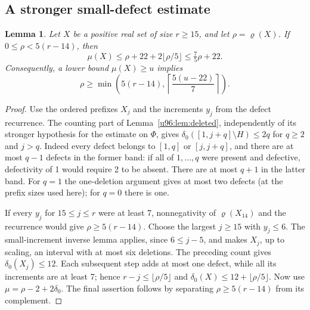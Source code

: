 \documentclass[11pt,a4paper]{article}
\newtheorem{lemma}[theorem]{Lemma}
\theoremstyle{remark}
\newcommand{\rhoD}{\varrho}
\begin{document}
\subsection{A stronger small-defect estimate}
\begin{lemma}\label{u96:lem:six-flexible98}
Let $X$ be a positive real set of size $r\geq15$, and let
$\rho=\rhoD(X)$. If $0\leq\rho<5(r-14)$, then
\[
 \mu(X)\leq\rho+22+2\lfloor\rho/5\rfloor
 \leq\tfrac75\rho+22.
\]
Consequently, a lower bound $\mu(X)\geq u$ implies
\[
 \rho\geq\min\left(5(r-14),
              \left\lceil\frac{5(u-22)}7\right\rceil\right).
\]
\end{lemma}
\begin{proof}
Use the ordered prefixes $X_j$ and the increments $y_j$ from the defect
recurrence. The counting part of Lemma~\ref{u96:lem:deleted}, independently of
its stronger hypothesis for the estimate on $\Phi$, gives
$\delta_0([1,j+q]\setminus H)\leq2q$ for $q\geq2$ and $j>q$.
Indeed every defect belongs to $[1,q]$ or $[j,j+q]$, and there are at most
$q-1$ defects in the former band: if all of $1,\ldots,q$ were present
and defective, defectivity of 1 would require 2 to be absent.
There are at most $q+1$ in the latter band. For $q=1$ the one-deletion
argument gives at most two defects (at the prefix sizes used here);
for $q=0$ there is one.

If every $y_j$ for $15\leq j\leq r$ were at least 7, nonnegativity of
$\rhoD(X_{14})$ and the recurrence would give
$\rho\geq5(r-14)$. Choose the largest $j\geq15$ with $y_j\leq6$.
The small-increment inverse lemma applies, since $6\leq j-5$, and makes
$X_j$, up to scaling, an interval with at most six deletions.
The preceding count gives $\delta_0(X_j)\leq12$.
Each subsequent step adds at most one defect, while all its increments
are at least 7; hence $r-j\leq\lfloor\rho/5\rfloor$ and
$\delta_0(X)\leq12+\lfloor\rho/5\rfloor$.
Now use $\mu=\rho-2+2\delta_0$. The final assertion follows by separating
$\rho\geq5(r-14)$ from its complement.
\end{proof}
\end{document}

